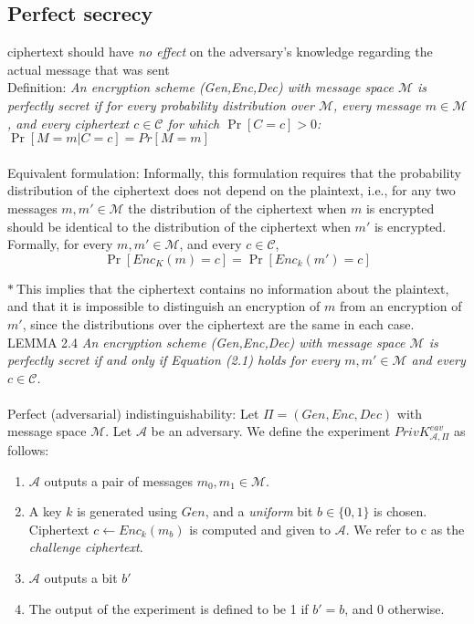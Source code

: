 \subsection*{Perfect secrecy} 
ciphertext should have \emph{no effect} on the adversary’s 
knowledge regarding the actual message that was sent\\
Definition: \emph{An encryption scheme 
\emph{(Gen,Enc,Dec)} with message space $\mathcal{M}$ is perfectly secret 
if for every probability distribution over $\mathcal{M}$, 
every message $m \in \mathcal{M}$, and every 
ciphertext $c \in \mathcal{C}$ for which $\Pr[C = c] > 0$:}
$\Pr[M=m|C=c]=Pr[M=m]$\\\\
Equivalent formulation: Informally, this formulation requires that the
 probability distribution of the ciphertext does not depend on the plaintext,
  i.e., for any two messages $m,m'\in\mathcal{M}$ the distribution of the 
  ciphertext when $m$ is encrypted should be identical to the distribution of
   the ciphertext when $m'$ is encrypted. 
   Formally, for every $m,m'\in\mathcal{M}$, and every $c\in\mathcal{C}$,
    \begin{equation}
        \Pr[Enc_K(m)=c]=\Pr[Enc_k(m')=c]\tag{2.1}
    \end{equation}

$\ast\ $This implies that the ciphertext contains no information about 
the plaintext, and that it is impossible to distinguish an encryption of
 $m$ from an encryption of $m'$, since the distributions over the ciphertext
  are the same in each case.\\

  {\color{forestgreen} LEMMA 2.4 \color{forestgreen}}
 \emph{An encryption scheme \emph{(Gen,Enc,Dec)} with message 
space $\mathcal{M}$ is perfectly secret if and only if Equation (2.1) holds 
for every $m,m'\in\mathcal{M}$ and every $c\in\mathcal{C}$.}\\\\

Perfect (adversarial) indistinguishability: Let $\Pi = (Gen,Enc,Dec)$ with 
message space $\mathcal{M}$. Let $\mathcal{A}$ be an adversary. We define the 
experiment $PrivK^{eav}_{\mathcal{A},\Pi}$ as follows:\\
\begin{enumerate}
  \item $\mathcal{A}$ outputs a pair of messages $m_0,m_1\in\mathcal{M}$.
  \item A key $k$ is generated using $Gen$, and a \emph{uniform} bit 
  $b\in\{ 0,1\}$ is chosen. Ciphertext $c\leftarrow Enc_k(m_b)$ is computed and 
  given to $\mathcal{A}$. We refer to c as the \emph{challenge ciphertext}.
  \item $\mathcal{A}$ outputs a bit $b'$
  \item The output of the experiment is defined to be 1 if $b'=b$, and 0 
  otherwise. 
\end{enumerate}

